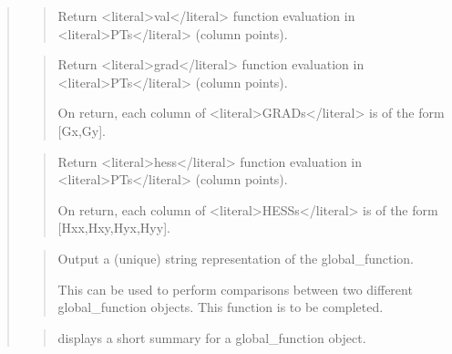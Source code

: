 \documentclass[a4paper,11pt,english]{sphinxmanual}
\begin{document}
\sphinxAtStartPar
{}
\begin{quote}

\sphinxAtStartPar
{}
\begin{quote}

\sphinxAtStartPar
Return \textless{}literal\textgreater{}val\textless{}/literal\textgreater{} function evaluation in \textless{}literal\textgreater{}PTs\textless{}/literal\textgreater{} (column points).
\end{quote}

\sphinxAtStartPar
{}
\begin{quote}

\sphinxAtStartPar
Return \textless{}literal\textgreater{}grad\textless{}/literal\textgreater{} function evaluation in \textless{}literal\textgreater{}PTs\textless{}/literal\textgreater{} (column points).

\sphinxAtStartPar
On return, each column of \textless{}literal\textgreater{}GRADs\textless{}/literal\textgreater{} is of the
form {[}Gx,Gy{]}.
\end{quote}

\sphinxAtStartPar
{}
\begin{quote}

\sphinxAtStartPar
Return \textless{}literal\textgreater{}hess\textless{}/literal\textgreater{} function evaluation in \textless{}literal\textgreater{}PTs\textless{}/literal\textgreater{} (column points).

\sphinxAtStartPar
On return, each column of \textless{}literal\textgreater{}HESSs\textless{}/literal\textgreater{} is of the
form {[}Hxx,Hxy,Hyx,Hyy{]}.
\end{quote}

\sphinxAtStartPar
{}
\begin{quote}

\sphinxAtStartPar
Output a (unique) string representation of the global\_function.

\sphinxAtStartPar
This can be used to perform comparisons between two
different global\_function objects.
This function is to be completed.
\end{quote}

\sphinxAtStartPar
{}
\begin{quote}

\sphinxAtStartPar
displays a short summary for a global\_function object.
\end{quote}
\end{quote}
\end{document}
